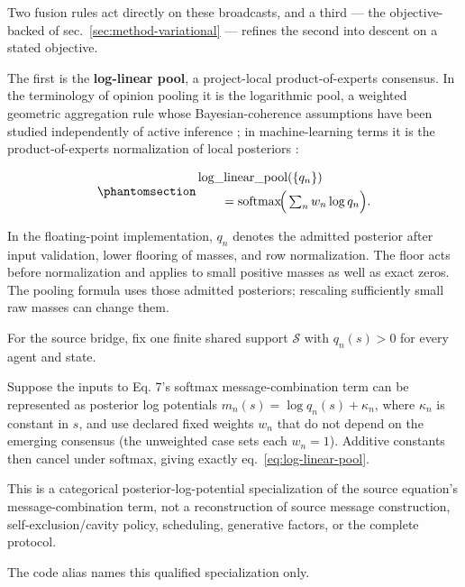\documentclass[
  english,
]{article}
\theoremstyle{plain}
\theoremstyle{definition}
\theoremstyle{remark}
\theoremstyle{definition}
\begin{document}
Two fusion rules act directly on these broadcasts, and a third --- the
objective-backed  of
sec.~\ref{sec:method-variational} --- refines the second into descent on
a stated objective.

The first is the \textbf{log-linear pool}, a project-local
product-of-experts consensus. In the terminology of opinion pooling it
is the logarithmic pool, a weighted geometric aggregation rule whose
Bayesian-coherence assumptions have been studied independently of active
inference
\citep{genest1986combining, genest1986externally, carvalho2023logpooling};
in machine-learning terms it is the product-of-experts normalization of
local posteriors \citep{hinton2002products}:

\begin{equation}\protect\phantomsection\label{eq:log-linear-pool}{\begin{aligned}
&\operatorname{log\_linear\_pool}(\{q_n\})\\
&\qquad = \mathrm{softmax}\!\Big(\textstyle\sum_n w_n \log q_n\Big).
\end{aligned}}\end{equation}

In the floating-point implementation, \(q_n\) denotes the admitted
posterior after input validation, lower flooring of masses, and row
normalization. The floor acts before normalization and applies to small
positive masses as well as exact zeros. The pooling formula uses those
admitted posteriors; rescaling sufficiently small raw masses can change
them.

For the source bridge, fix one finite shared support \(\mathcal S\) with
\(q_n(s)>0\) for every agent and state.

Suppose the inputs to Eq. 7's softmax message-combination term can be
represented as posterior log potentials \(m_n(s)=\log q_n(s)+\kappa_n\),
where \(\kappa_n\) is constant in \(s\), and use declared fixed weights
\(w_n\) that do not depend on the emerging consensus (the unweighted
case sets each \(w_n=1\)). Additive constants then cancel under softmax,
giving exactly eq.~\ref{eq:log-linear-pool}.

This is a categorical posterior-log-potential specialization of the
source equation's message-combination term, not a reconstruction of
source message construction, self-exclusion/cavity policy, scheduling,
generative factors, or the complete protocol.

The code alias  names this qualified
specialization only.
\end{document}
